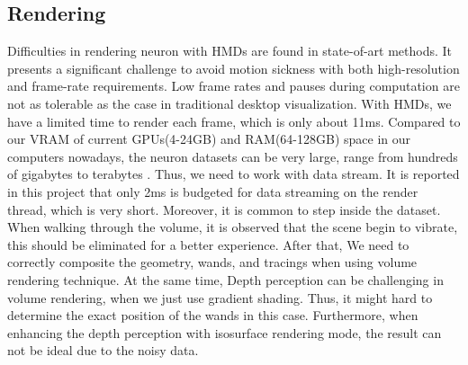 \documentclass[10pt,twocolumn,letterpaper]{article}
\begin{document}
\subsection{Rendering}
Difficulties in rendering neuron with HMDs are found in state-of-art methods. It presents a significant challenge to avoid motion sickness with both high-resolution and frame-rate requirements. Low frame rates and pauses during computation are not as tolerable as the case in traditional desktop visualization. With HMDs, we have a limited time to render each frame, which is only about 11ms. Compared to our VRAM of current GPUs(4-24GB) and RAM(64-128GB) space in our computers nowadays, the neuron datasets can be very large, range from hundreds of gigabytes to terabytes \cite{Usher2018}. Thus, we need to work with data stream. It is reported in this project that only 2ms is budgeted for data streaming on the render thread, which is very short. Moreover, it is common to step inside the dataset. When walking through the volume, it is observed that the scene begin to vibrate, this should be eliminated for a better experience. After that, We need to correctly composite the geometry, wands, and tracings when using volume rendering technique. At the same time, Depth perception can be challenging in volume rendering, when we just use gradient shading. Thus, it might hard to determine the exact position of the wands in this case. Furthermore, when enhancing the depth perception with isosurface rendering mode, the result can not be ideal due to the noisy data.
\end{document}
